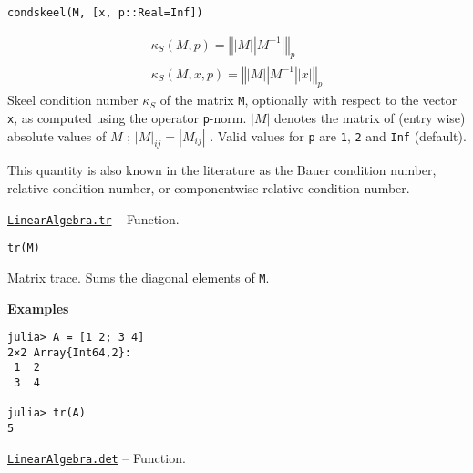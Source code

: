 \begin{adjustwidth}{2em}{0pt}


\begin{verbatim}
condskeel(M, [x, p::Real=Inf])
\end{verbatim}

\begin{equation*}
\begin{split}\kappa_S(M, p) = \left\Vert \left\vert M \right\vert \left\vert M^{-1} \right\vert \right\Vert_p \\
\kappa_S(M, x, p) = \left\Vert \left\vert M \right\vert \left\vert M^{-1} \right\vert \left\vert x \right\vert \right\Vert_p\end{split}\end{equation*}
Skeel condition number  \(\kappa_S\)  of the matrix \texttt{M}, optionally with respect to the vector \texttt{x}, as computed using the operator \texttt{p}-norm.  \(\left\vert M \right\vert\)  denotes the matrix of (entry wise) absolute values of  \(M\) ;  \(\left\vert M \right\vert_{ij} = \left\vert M_{ij} \right\vert\) . Valid values for \texttt{p} are \texttt{1}, \texttt{2} and \texttt{Inf} (default).

This quantity is also known in the literature as the Bauer condition number, relative condition number, or componentwise relative condition number.



\end{adjustwidth}
\hypertarget{3355659645971312171}{} 
\hyperlink{3355659645971312171}{\texttt{LinearAlgebra.tr}}  -- {Function.}

\begin{adjustwidth}{2em}{0pt}


\begin{verbatim}
tr(M)
\end{verbatim}

Matrix trace. Sums the diagonal elements of \texttt{M}.

\textbf{Examples}


\begin{verbatim}
julia> A = [1 2; 3 4]
2×2 Array{Int64,2}:
 1  2
 3  4

julia> tr(A)
5
\end{verbatim}



\end{adjustwidth}
\hypertarget{16543378577000914469}{} 
\hyperlink{16543378577000914469}{\texttt{LinearAlgebra.det}}  -- {Function.}

